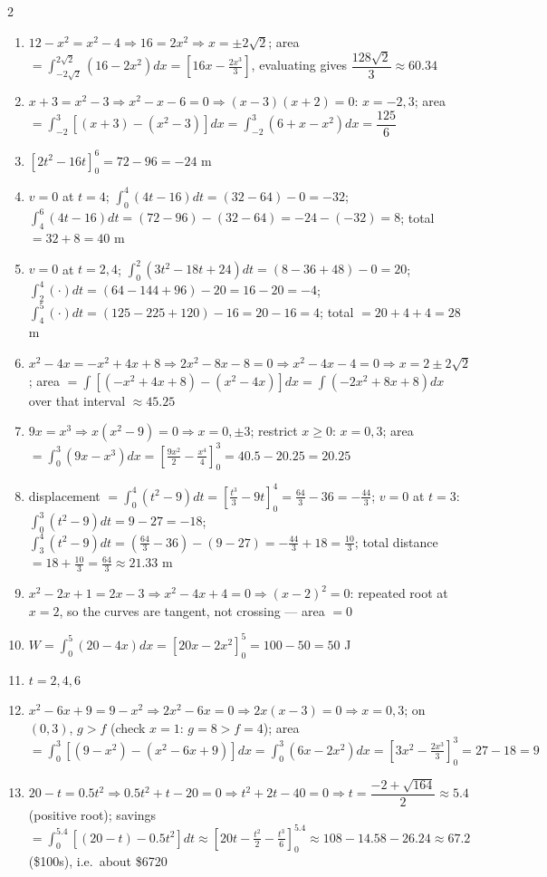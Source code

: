 \documentclass[11pt]{article}
\begin{document}
\begin{keybox}
\begin{multicols}{2}
\small
\begin{enumerate}[leftmargin=*,itemsep=3pt]
  \item $12-x^2=x^2-4\Rightarrow16=2x^2\Rightarrow x=\pm2\sqrt2$; area $=\int_{-2\sqrt2}^{2\sqrt2}(16-2x^2)dx=\left[16x-\tfrac{2x^3}3\right]$, evaluating gives $\dfrac{128\sqrt2}{3}\approx60.34$
  \item $x+3=x^2-3\Rightarrow x^2-x-6=0\Rightarrow(x-3)(x+2)=0$: $x=-2,3$; area $=\int_{-2}^3[(x+3)-(x^2-3)]dx=\int_{-2}^3(6+x-x^2)dx=\dfrac{125}6$
  \item $[2t^2-16t]_0^6=72-96=-24$ m
  \item $v=0$ at $t=4$; $\int_0^4(4t-16)dt=(32-64)-0=-32$; $\int_4^6(4t-16)dt=(72-96)-(32-64)=-24-(-32)=8$; total $=32+8=40$ m
  \item $v=0$ at $t=2,4$; $\int_0^2(3t^2-18t+24)dt=(8-36+48)-0=20$; $\int_2^4(\cdot)dt=(64-144+96)-20=16-20=-4$; $\int_4^5(\cdot)dt=(125-225+120)-16=20-16=4$; total $=20+4+4=28$ m
  \item $x^2-4x=-x^2+4x+8\Rightarrow2x^2-8x-8=0\Rightarrow x^2-4x-4=0\Rightarrow x=2\pm2\sqrt2$; area $=\int[(-x^2+4x+8)-(x^2-4x)]dx=\int(-2x^2+8x+8)dx$ over that interval $\approx45.25$
  \item $9x=x^3\Rightarrow x(x^2-9)=0\Rightarrow x=0,\pm3$; restrict $x\geq0$: $x=0,3$; area $=\int_0^3(9x-x^3)dx=\left[\tfrac{9x^2}2-\tfrac{x^4}4\right]_0^3=40.5-20.25=20.25$
  \item displacement $=\int_0^4(t^2-9)dt=[\tfrac{t^3}3-9t]_0^4=\tfrac{64}3-36=-\tfrac{44}3$; $v=0$ at $t=3$: $\int_0^3(t^2-9)dt=9-27=-18$; $\int_3^4(t^2-9)dt=(\tfrac{64}3-36)-(9-27)=-\tfrac{44}3+18=\tfrac{10}3$; total distance $=18+\tfrac{10}3=\tfrac{64}3\approx21.33$ m
  \item $x^2-2x+1=2x-3\Rightarrow x^2-4x+4=0\Rightarrow(x-2)^2=0$: repeated root at $x=2$, so the curves are tangent, not crossing --- area $=0$
  \item $W=\int_0^5(20-4x)dx=[20x-2x^2]_0^5=100-50=50$ J
  \item $t=2,4,6$
  \item $x^2-6x+9=9-x^2\Rightarrow2x^2-6x=0\Rightarrow2x(x-3)=0\Rightarrow x=0,3$; on $(0,3)$, $g>f$ (check $x=1$: $g=8>f=4$); area $=\int_0^3[(9-x^2)-(x^2-6x+9)]dx=\int_0^3(6x-2x^2)dx=[3x^2-\tfrac{2x^3}3]_0^3=27-18=9$
  \item $20-t=0.5t^2\Rightarrow0.5t^2+t-20=0\Rightarrow t^2+2t-40=0\Rightarrow t=\dfrac{-2+\sqrt{164}}2\approx5.4$ (positive root); savings $=\int_0^{5.4}[(20-t)-0.5t^2]dt\approx[20t-\tfrac{t^2}2-\tfrac{t^3}6]_0^{5.4}\approx108-14.58-26.24\approx67.2$ (\$100s), i.e.\ about \$6720
\end{enumerate}
\end{multicols}
\end{keybox}
\end{document}
